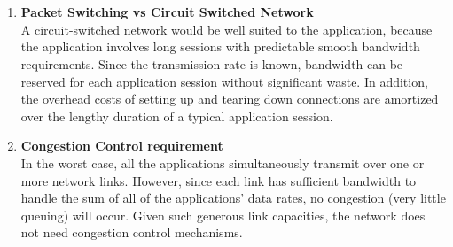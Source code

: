 \documentclass[12pt]{article}
\begin{document}
\section{}
    \begin{enumerate}[label=(\alph*)]
    
    \item \textbf{Packet Switching vs Circuit Switched Network} \\
    A circuit-switched network would be well suited to the application, because the application involves long sessions with predictable smooth bandwidth requirements.
    Since the transmission rate is known, bandwidth can be reserved for each application session without significant waste. In addition, the overhead costs of setting up and tearing down connections are amortized over the lengthy duration of a typical application session.

    \item \textbf{Congestion Control requirement} \\
    In the worst case, all the applications simultaneously transmit over one or more network links. However, since each link has sufficient bandwidth to handle the sum of all of the applications' data rates, no congestion (very little queuing) will occur.
    Given such generous link capacities, the network does not need congestion control mechanisms.
    \end{enumerate}
    
\end{document}
